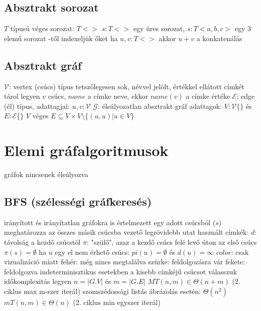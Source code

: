 \documentclass[12pt,a4paper]{article}
\begin{document}
\subsection{Absztrakt sorozat}

\begin{outline}
	\1 $T$ típusú véges sorozat: $T<>$
	\1 $s : T<>$ egy üres sorozat, $s : T<a,b,c>$ egy 3 elemű sorozat
	-től indexeljük őket
	\1 ha $u,v : T<>$ akkor $u+v$ a konkatenálás
\end{outline}

\subsection{Absztrakt gráf}

\begin{outline}
	\1 $\mathcal{V}$: vertex (csúcs) típus
		\2 tetszőlegesen sok, névvel jelölt, értékkel ellátott címkét tárol
		\2 legyen $v$ csúcs, $name$ a címke neve, ekkor $name(v)$ a címke értéke
	\1 $\mathcal{E}$: edge (él) típus, adattagjai: $u,v : \mathcal{V}$
	\1 $\mathcal{G}$: élsúlyozatlan absztrakt gráf
		\2 adattagok: $V:\mathcal{V}\{\}$ és $E:\mathcal{E}\{\}$
		\2 $V$ véges
		\2 $E \subseteq V \times V \setminus \{(u,u) | u \in V\}$
\end{outline}

\pagebreak

\section{Elemi gráfalgoritmusok}

\begin{outline}
	\1 gráfok nincsenek élsúlyozva
\end{outline}

\subsection{BFS (szélességi gráfkeresés)}

\begin{outline}
	\1 irányított és irányítatlan gráfokra is értelmezett
	\1 egy adott csúcsból ($s$) meghatározza az összes másik csúcsba vezető legrövidebb utat
	\1 használt címkék:
		\2 $d$: távolság a kezdő csúcstól
		\2 $\pi$: "szülő", azaz a kezdő csúcs felé levő úton az első csúcs
			\3 $\pi(s)=\emptyset$
		\2 ha $u$ egy el nem érhető csúcs: $pi(u)=\emptyset$ és $d(u)=\infty$
		\2 $color$: csak vizualizáció miatt
			\3 fehér: még nincs megtalálva
			\3 szürke: feldolgozásra vár
			\3 fekete: feldolgozva
	\1 indeterminisztikus esetekben a kisebb címkéjű csúcsot válasszuk
	\1 időkomplexitás
		\2 legyen $n=|G.V|$ és $m=|G.E|$
		\2 $MT(n,m) \in \Theta(n+m)$ (2. ciklus max m-szer iterál)
			\3 szomszédossági listás ábrázolás esetén: $\Theta(n^2)$
		\2 $mT(n,m) \in \Theta(n)$ (2. ciklus min egyszer iterál)
\end{outline}
\end{document}
